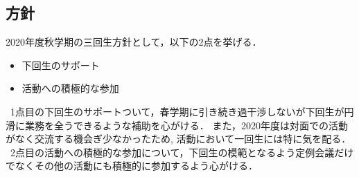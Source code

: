 \subsection*{\newGradeIfKouki{}\thirdGrade{}方針}


2020年度秋学期の三回生方針として，以下の2点を挙げる．
\begin{itemize}
  \item 下回生のサポート
  \item 活動への積極的な参加
\end{itemize}
\ 1点目の下回生のサポートついて，春学期に引き続き過干渉しないが下回生が円滑に業務を全うできるような補助を心がける．
また，2020年度は対面での活動がなく交流する機会ぎ少なかったため, 活動において一回生には特に気を配る．
\ 2点目の活動への積極的な参加について，下回生の模範となるよう定例会議だけでなくその他の活動にも積極的に参加するよう心がける．
